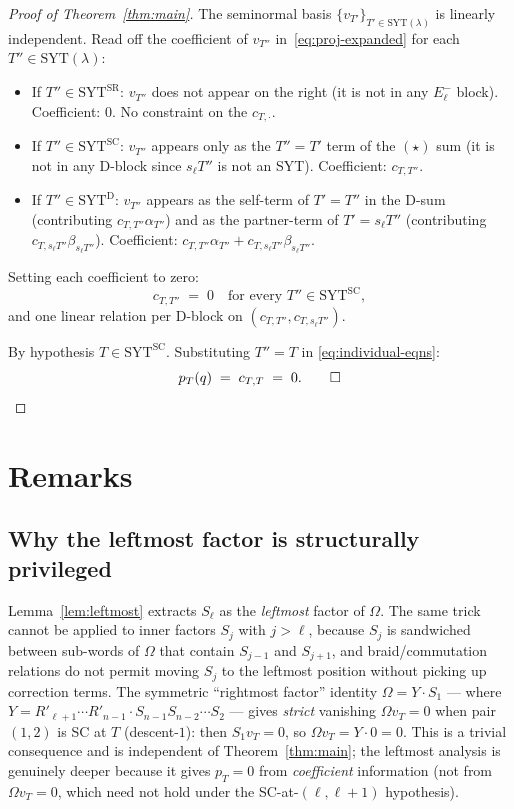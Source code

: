 \documentclass[11pt]{article}
\theoremstyle{definition}
\newcommand{\Om}{\Omega}
\newcommand{\Rp}{{R'}}
\newcommand{\SYT}{\mathrm{SYT}}
\newcommand{\Eminus}{E^-}
\newcommand{\pT}{p_T}
\begin{document}
\begin{proof}[Proof of Theorem~\ref{thm:main}]
The seminormal basis $\{v_{T'}\}_{T' \in \SYT(\lambda)}$ is linearly
independent. Read off the coefficient of $v_{T''}$ in~\eqref{eq:proj-expanded}
for each $T'' \in \SYT(\lambda)$:
\begin{itemize}[topsep=0.2em,itemsep=0.1em]
\item If $T'' \in \SYT^{\mathrm{SR}}$: $v_{T''}$ does not appear on the
   right (it is not in any $\Eminus_\ell$ block). Coefficient: $0$. No
   constraint on the $c_{T,\cdot}$.
\item If $T'' \in \SYT^{\mathrm{SC}}$: $v_{T''}$ appears only as the
   $T'' = T'$ term of the $(\star)$ sum (it is not in any D-block since
   $s_\ell T''$ is not an SYT). Coefficient: $c_{T,T''}$.
\item If $T'' \in \SYT^{\mathrm{D}}$: $v_{T''}$ appears as the self-term
   of $T' = T''$ in the D-sum (contributing $c_{T,T''} \alpha_{T''}$) and
   as the partner-term of $T' = s_\ell T''$ (contributing
   $c_{T, s_\ell T''} \beta_{s_\ell T''}$). Coefficient:
   $c_{T,T''} \alpha_{T''} + c_{T, s_\ell T''} \beta_{s_\ell T''}$.
\end{itemize}

Setting each coefficient to zero:
\begin{equation}\label{eq:individual-eqns}
   c_{T,T''} \;=\; 0 \quad \text{for every } T'' \in \SYT^{\mathrm{SC}},
\end{equation}
and one linear relation per D-block on $(c_{T,T''}, c_{T, s_\ell T''})$.

By hypothesis $T \in \SYT^{\mathrm{SC}}$. Substituting $T'' = T$ in
\eqref{eq:individual-eqns}:
\[
   \pT(q) \;=\; c_{T,T} \;=\; 0. \qed
\]
\end{proof}

\section{Remarks}\label{sec:remarks}

\subsection{Why the leftmost factor is structurally privileged}

Lemma~\ref{lem:leftmost} extracts $S_\ell$ as the \emph{leftmost} factor
of $\Om$. The same trick cannot be applied to inner factors $S_j$ with
$j > \ell$, because $S_j$ is sandwiched between sub-words of $\Om$ that
contain $S_{j-1}$ and $S_{j+1}$, and braid/commutation relations do not
permit moving $S_j$ to the leftmost position without picking up
correction terms. The symmetric ``rightmost factor'' identity
$\Om = Y \cdot S_1$ — where $Y = \Rp_{\ell+1} \cdots \Rp_{n-1} \cdot
S_{n-1} S_{n-2} \cdots S_2$ — gives \emph{strict} vanishing
$\Om v_T = 0$ when pair $(1, 2)$ is SC at $T$ (descent-$1$): then
$S_1 v_T = 0$, so $\Om v_T = Y \cdot 0 = 0$. This is a trivial
consequence and is independent of Theorem~\ref{thm:main}; the leftmost
analysis is genuinely deeper because it gives $p_T = 0$ from
\emph{coefficient} information (not from $\Om v_T = 0$, which need
not hold under the SC-at-$(\ell, \ell+1)$ hypothesis).
\end{document}
